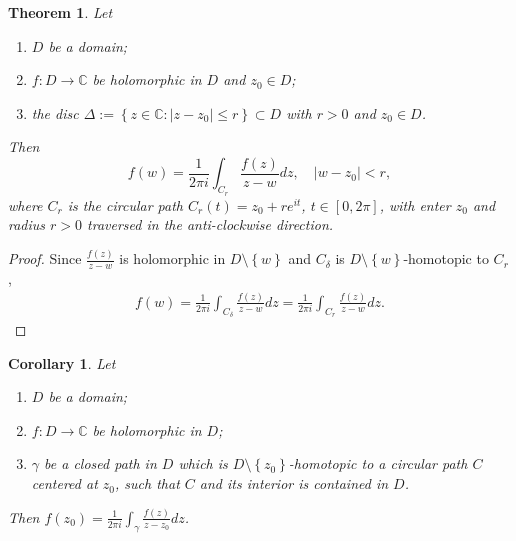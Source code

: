 \documentclass[12pt,openany]{book}
\newtheorem{theorem}{Theorem}[chapter]
\newtheorem{corollary}{Corollary}[theorem]
\theoremstyle{definition}
\newcommand{\set}[1]{\left\{#1\right\}}
\newcommand{\C}{\mathbb{C}}
\newcommand{\of}[1]{\left( #1 \right)}
\newcommand{\abs}[1]{\left\lvert #1 \right\rvert}
\begin{document}
	\begin{tcolorbox}[colback=white,colframe=thmcolor,arc=5pt,title={\color{white}\bf The Cauchy Integral Formula for Circular Paths}]
		\begin{theorem}
			Let \begin{enumerate}[(1)]
				\item $D$ be a domain;
				\item $f:D\to\C$ be holomorphic in $D$ and $z_0\in D$;
				\item the disc $\Delta:=\set{z\in\C:\abs{z-z_0}\leq r}\subset D$ with $r>0$ and $z_0\in D$.
			\end{enumerate} Then \[
			f\of{w}=\frac{1}{2\pi i}\int_{C_r}\frac{f\of{z}}{z-w}dz,\quad \abs{w-z_0}<r,
			\] where $C_r$ is the circular path $C_r\of{t}=z_0+re^{it}$, $t\in[0,2\pi]$, with enter $z_0$ and radius $r>0$ traversed in the anti-clockwise direction.
		\end{theorem}
	\end{tcolorbox}
	\begin{proof}
		Since $\displaystyle\frac{f\of{z}}{z-w
		}$ is holomorphic in $D\setminus\set{w}$ and $C_\delta$ is $D\setminus\set{w}$-homotopic to $C_{r}$,
		\begin{align*}
		f\of{w}=\frac{1}{2\pi i}\int_{C_\delta}\frac{f\of{z}}{z-w}dz=\frac{1}{2\pi i}\int_{C_r}\frac{f\of{z}}{z-w}dz.
		\end{align*}
	\end{proof}
	
	\begin{tcolorbox}[colback=white,colframe=corcolor,arc=5pt,title={\color{white}\bf The Cauchy Integral Formula for General Paths}]
		\begin{corollary}
			Let \begin{enumerate}[(1)]
				\item $D$ be a domain;
				\item $f:D\to\C$ be holomorphic in $D$;
				\item $\gamma$ be a closed path in $D$ which is $D\setminus\set{z_0}$-homotopic to a circular path $C$ centered at $z_0$, such that $C$ and its interior is contained in $D$.
			\end{enumerate} Then $\displaystyle f\of{z_0}=\frac{1}{2\pi i}\int_\gamma\frac{f\of{z}}{z-z_0}dz$.
		\end{corollary}
	\end{tcolorbox}
	
	\newpage
\end{document}
